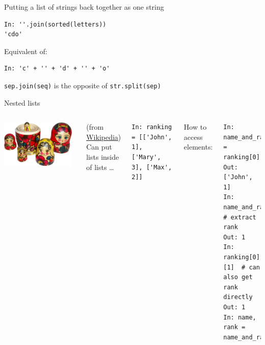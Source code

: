 \documentclass[aspectratio=169,usenames,dvipsnames]{beamer}
\begin{document}
\begin{frame}[fragile]{Putting a list of strings back together as one string}
\begin{lstlisting}
In: ''.join(sorted(letters))
'cdo'
\end{lstlisting}
Equivalent of:
\begin{lstlisting}
In: 'c' + '' + 'd' + '' + 'o'
\end{lstlisting}

\texttt{sep.join(seq)} is the opposite of \texttt{str.split(sep)}
\end{frame}


\begin{frame}[fragile]{Nested lists}
    \begin{columns}
            \includegraphics[width=0.95\textwidth]{fig/russiandolls}

            {\scriptsize
            (from \href{https://en.wikipedia.org/wiki/Matryoshka_doll#/media/File:Matryoshka_transparent.png}{Wikipedia})}
            Can put lists inside of lists \dots
\begin{lstlisting}
In: ranking = [['John', 1], ['Mary', 3], ['Max', 2]]
\end{lstlisting}

\pause
How to access elements:
\begin{lstlisting}
In: name_and_rank = ranking[0]
Out: ['John', 1]
In: name_and_rank[1]  # extract rank
Out: 1
In: ranking[0][1]  # can also get rank directly
Out: 1
In: name, rank = name_and_rank
\end{lstlisting}
    \end{columns}
\end{frame}
\end{document}
